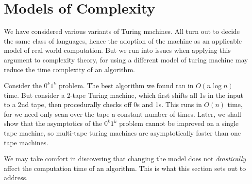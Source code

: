 \section{Models of Complexity}

We have considered various variants of Turing machines. All turn out to decide the same class of languages, hence the adoption of the machine as an applicable model of real world computation. But we run into issues when applying this argument to complexity theory, for using a different model of turing machine may reduce the time complexity of an algorithm.

\begin{example}
    Consider the $0^k1^k$ problem. The best algorithm we found ran in $O(n \log n)$ time. But consider a 2-tape Turing machine, which first shifts all 1s in the input to a 2nd tape, then procedurally checks off 0s and 1s. This runs in $O(n)$ time, for we need only scan over the tape a constant number of times. Later, we shall show that the asymptotics of the $0^k1^k$ problem cannot be improved on a single tape machine, so multi-tape turing machines are asymptotically faster than one tape machines.
\end{example}

We may take comfort in discovering that changing the model does not {\it drastically} affect the computation time of an algorithm. This is what this section sets out to address.

